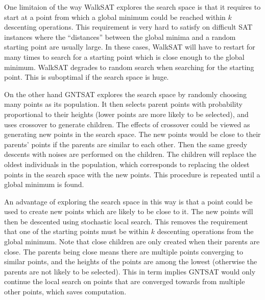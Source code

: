 One limitaion of the way WalkSAT explores the search space is that it requires
to start at a point from which a global minimum could be reached within
$k$ descenting operations. This requirement is very hard to
satisfy on difficult SAT instances where the ``distances'' between the global
minima and a random starting point are usually large. In these cases, WalkSAT
will have to restart for many times to search for a starting point which is
close enough to the global minimum. WalkSAT degrades to random search when searching
for the starting point. This is suboptimal if the search space is huge.

On the other hand GNTSAT explores the search space by randomly choosing many
points as its population. It then selects parent points with probability
proportional to their heights (lower points are more likely to be selected),
and uses crossover to generate children. The effects of crossover could be
viewed as generating new points in the search space. The new points would be
close to their parents' points if the parents are similar to each other. Then
the same greedy descents with noises are performed on the children. The
children will replace the oldest individuals in the population, which
corresponds to replacing the oldest points in the search space with the new
points. This procedure is repeated until a global minimum is found.

An advantage of exploring the search space in this way is that a point could
be used to create new points which are likely to be close to it. The new points
will then be descented using stochastic local search. This removes the
requirement that one of the starting points must be within
$k$ descenting operations from the global minimum. Note
that close children are only created when their parents are close. The parents
being close means there are multiple points converging to similar points, and
the heights of the points are among the lowest (otherwise the parents are not
likely to be selected). This in term implies GNTSAT would only continue the local
search on points that are converged towards from multiple other points, which saves
computation.

